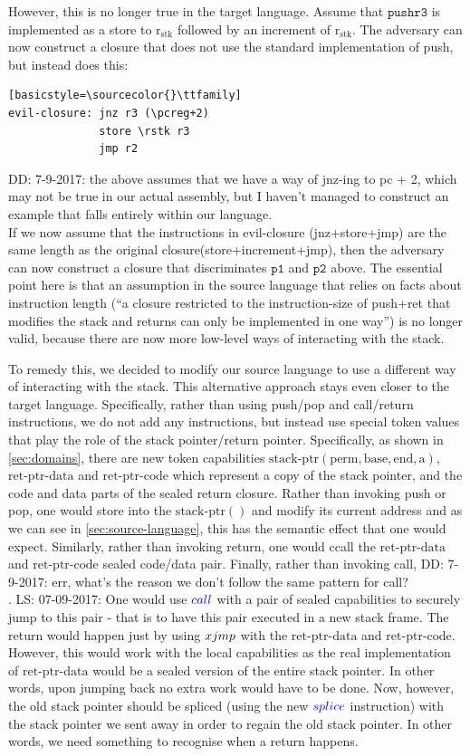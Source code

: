 \documentclass[a4paper]{article}
\newcommand\lau[1]{{\color{purple} \sf \footnotesize {LS: #1}}\\}
\newcommand\dominique[1]{{\color{purple} \sf \footnotesize {DD: #1}}\\}
\newcommand{\sourcecolor}[1]{\color{blue}}
\newcommand{\src}[1]{{\sourcecolor{} #1}}
\newcommand{\targetcolor}[1]{\color{black}}
\newcommand{\trg}[1]{{\targetcolor{} #1}}
\newcommand{\zinstr}[1]{#1}
\newcommand{\twoinstr}[3]{
  \ifthenelse{\equal{#2#3}{}}
  {\zinstr{#1}}
  {\zinstr{#1} \; #2 \; #3}
}
\newcommand{\scall}[2]{\twoinstr{\src{call}}{#1}{#2}}
\newcommand{\sxjmp}[2]{\twoinstr{\trg{xjmp}}{#1}{#2}}
\newcommand{\ssplice}[2]{\twoinstr{\src{splice}}{#1}{#2}}
\newcommand{\shareddom}[1]{\mathrm{#1}}
\newcommand{\permbnf}{\shareddom{perm}}
\newcommand{\addrbnf}{\shareddom{a}}
\newcommand{\basebnf}{\shareddom{base}}
\newcommand{\aendbnf}{\shareddom{end}}
\newcommand{\stkptr}[1]{\mathrm{stack\text{-}ptr}(#1)}
\newcommand{\retptrd}{\mathrm{ret\text{-}ptr\text{-}data}}
\newcommand{\retptrc}{\mathrm{ret\text{-}ptr\text{-}code}}
\newcommand{\pcreg}{\mathrm{pc}}
\newcommand{\rstk}{\mathrm{r}_\mathrm{stk}}
\begin{document}
However, this is no longer true in the target language.
Assume that $\mathtt{push r3}$ is implemented as a store to $\rstk$ followed by an increment of $\rstk$.
The adversary can now construct a closure that does not use the standard implementation of push, but instead does this:
\begin{lstlisting}
[basicstyle=\sourcecolor{}\ttfamily] 
evil-closure: jnz r3 (\pcreg+2)
              store \rstk r3
              jmp r2
\end{lstlisting}
\dominique{7-9-2017: the above assumes that we have a way of jnz-ing to pc + 2, which may not be true in our actual assembly, but I haven't managed to construct an example that falls entirely within our language.}
If we now assume that the instructions in evil-closure (jnz+store+jmp) are the same length as the original closure(store+increment+jmp), then the adversary can now construct a closure that discriminates $\mathtt{p1}$ and $\mathtt{p2}$ above.
The essential point here is that an assumption in the source language that relies on facts about instruction length (``a closure restricted to the instruction-size of push+ret that modifies the stack and returns can only be implemented in one way'') is no longer valid, because there are now more low-level ways of interacting with the stack.

To remedy this, we decided to modify our source language to use a different way of interacting with the stack.
This alternative approach stays even closer to the target language.
Specifically, rather than using push/pop and call/return instructions, we do not add any instructions, but instead use special token values that play the role of the stack pointer/return pointer.
Specifically, as shown in \cref{sec:domains}, there are new token capabilities $\stkptr{\permbnf,\basebnf,\aendbnf,\addrbnf}$, $\retptrd$ and $\retptrc$ which represent a copy of the stack pointer, and the code and data parts of the sealed return closure.
Rather than invoking push or pop, one would store into the $\stkptr{}$ and modify its current address and as we can see in \cref{sec:source-language}, this has the semantic effect that one would expect.
Similarly, rather than invoking return, one would ccall the $\retptrd$ and $\retptrc$ sealed code/data pair.
Finally, rather than invoking call, \dominique{7-9-2017: err, what's the reason we don't follow the same pattern for call?}.
\lau{07-09-2017: One would use $\scall{}{}$ with a pair of sealed capabilities to securely jump to this pair - that is to have this pair executed in a new stack frame. The return would happen just by using $\sxjmp{}{}$ with the $\retptrd$ and $\retptrc$. However, this would work with the local capabilities as the real implementation of $\retptrd$ would be a sealed version of the entire stack pointer. In other words, upon jumping back no extra work would have to be done. Now, however, the old stack pointer should be spliced (using the new $\ssplice{}{}$ instruction) with the stack pointer we sent away in order to regain the old stack pointer. In other words, we need something to recognise when a return happens.}
\end{document}
